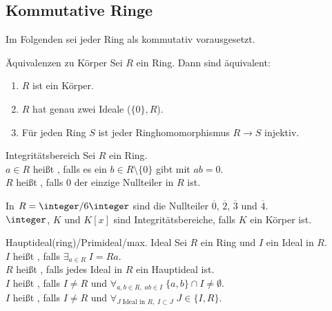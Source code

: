 \subsection{%
    Kommutative Ringe%
}

\begin{Bem}
    Im Folgenden sei jeder Ring als kommutativ vorausgesetzt.
\end{Bem}

\begin{Prop}{Äquivalenzen zu Körper}
    Sei $R$ ein Ring.
    Dann sind äquivalent:
    \begin{enumerate}[label=(\alph*)]
        \item
        $R$ ist ein Körper.
        
        \item
        $R$ hat genau zwei Ideale ($\{0\}, R$).
        
        \item
        Für jeden Ring $S$ ist jeder Ringhomomorphismus $R \rightarrow S$
        injektiv.
    \end{enumerate}
\end{Prop}

\begin{Def}{Integritätsbereich}
    Sei $R$ ein Ring.\\
    $a \in R$ heißt , falls es ein
    $b \in R \setminus \{0\}$ gibt mit $ab = 0$.\\
    $R$ heißt , falls $0$ der einzige Nullteiler
    in $R$ ist.
\end{Def}

\begin{Bsp}
    In $R = \integer/6\integer$ sind die Nullteiler $\overline{0}$,
    $\overline{2}$, $\overline{3}$ und $\overline{4}$.\\
    $\integer$, $K$ und $K[x]$ sind Integritätsbereiche, falls
    $K$ ein Körper ist.
\end{Bsp}

\linie

\begin{Def}{Hauptideal(ring)/Primideal/max. Ideal}
    Sei $R$ ein Ring und $I$ ein Ideal in $R$.\\
    $I$ heißt , falls $\exists_{a \in R}\; I = Ra$.\\
    $R$ heißt , falls jedes Ideal in $R$ ein Hauptideal
    ist.\\
    $I$ heißt , falls $I \not= R$ und
    $\forall_{a, b \in R,\; ab \in I}\; \{a, b\} \cap I \not= \emptyset$.\\
    $I$ heißt , falls $I \not= R$ und
    $\forall_{J \text{ Ideal in } R,\; I \subset J}\; J \in \{I, R\}$.
\end{Def}

